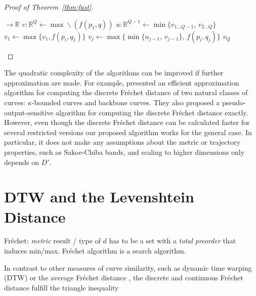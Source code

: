 \begin{proof}[Proof of Theorem~\ref{thm:fast}]
\begin{algorithm}
    \caption{Variant of Alg.~\ref{alg:vanilla} without recursions and explicit branching points, and a linear memory requirement.}
    \label{alg:linear}
    \begin{algorithmic}[1]
         $\to \mathbb{R}$
            \State $v: \mathbb{R}^Q \gets \max\!\backslash(f(p_1, q))$
            \Statex
                \State $u: \mathbb{R}^{Q-1} \gets \min\{ v_{1 \ldots Q-1},\, v_{2 \ldots Q} \}$
                \Statex
                \State $v_1 \gets \max\{ v_1, f(p_i, q_1) \}$
                    \State $v_j \gets \max\{ \min\{ u_{j-1},\, v_{j-1} \},\, f(p_i, q_j) \}$ 
                \EndFor
            \EndFor
            \Statex
            \State \Return $v_Q$
        \EndFunction
    \end{algorithmic}
\end{algorithm}
\end{proof}

The quadratic complexity of the algorithms can be improved if further approximation are made.
For example, \citet{aronov06} presented an efficient approximation algorithm for computing the discrete Fr\'echet distance of two natural classes of curves: $\kappa$-bounded curves and backbone curves.
They also proposed a pseudo-output-sensitive algorithm for computing the discrete Fr\'echet distance exactly.
However, even though the discrete Fr\'echet distance can be calculated faster for several restricted versions \citep{driemel12,gudmundsson18,buchin10,maheshwari11} our proposed algorithm works for the general case.
In particular, it does not make any assumptions about the metric or trajectory properties, such as Sakoe-Chiba bands, and scaling to higher dimensions only depends on $D'$.

\section{DTW and the Levenshtein Distance}
\label{sec:dtw_levenshtein}
Fr\'echet: \textit{metric} result / type of $d$ has to be a set with a \textit{total preorder} that induces min/max. Fr\'echet algorithm is a search algorithm.

In contrast to other measures of curve similarity, such as dynamic time warping (DTW) \citep{vintsyuk68,sankoff83} or the average Fr\'echet distance \citep{brakatsoulas05}, the discrete and continuous Fr\'echet distance fulfill the triangle inequality 


